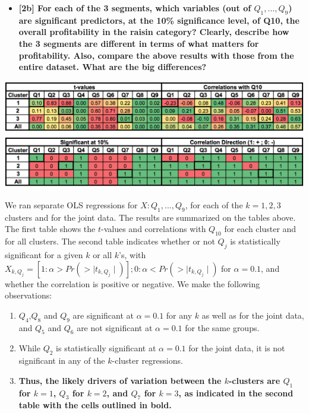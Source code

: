 \documentclass[10pt, oneside,spanish]{article}
\begin{document}
\begin{itemize}
\item \textbf{[2b]   For each of the 3 segments, which variables (out of $ Q_{1},...,Q_{9} $) are significant predictors, at the 10\% significance level, of Q10, the overall profitability in the raisin category?  Clearly, describe how the 3 segments are different in terms of what matters for profitability. Also, compare the above results with those from the entire dataset. What are the big differences?   }
\end{itemize}
\begin{center}
\includegraphics[width=15cm]{2b1.png}
\end{center}
We ran separate OLS regressions for $X: Q_{1},...,Q_{9} $, for each of the $k = 1,2,3 $ clusters and for the joint data. The results are summarized on the tables above. The first table shows the $t$-values and correlations with $Q_10$ for each cluster and for all clusters. The second table indicates whether or not $Q_j$ is statistically significant for a given $k$ or all $k$'s, with $X_{k,Q_{j}} = [1: \alpha > Pr(>\mid t_{k,Q_{j}} \mid ) ]; 0: \alpha < Pr(>\mid t_{k,Q_{j}} \mid )  $ for $\alpha = 0.1 $, and whether the correlation is positive or negative. We make the following observations:
\begin{enumerate}
\item $Q_{4}$,$Q_{8}$ and $Q_{9}$ are significant at $\alpha = 0.1$ for any $k$ as well as for the joint data, and $Q_{5}$ and $Q_{6}$ are not significant at $\alpha = 0.1$ for the same groups.
\item While $Q_{2}$ is statistically significant at $\alpha = 0.1$ for the joint data, it is not significant in any of the $k$-cluster regressions.
\item \textbf{ Thus, the likely drivers of variation between the $k$-clusters are $Q_{1}$ for $k=1$, $Q_{3}$ for $k=2$, and $Q_{7}$ for $k=3$, as indicated in the second table with the cells outlined in bold. }
\end{enumerate} 
\end{document}
